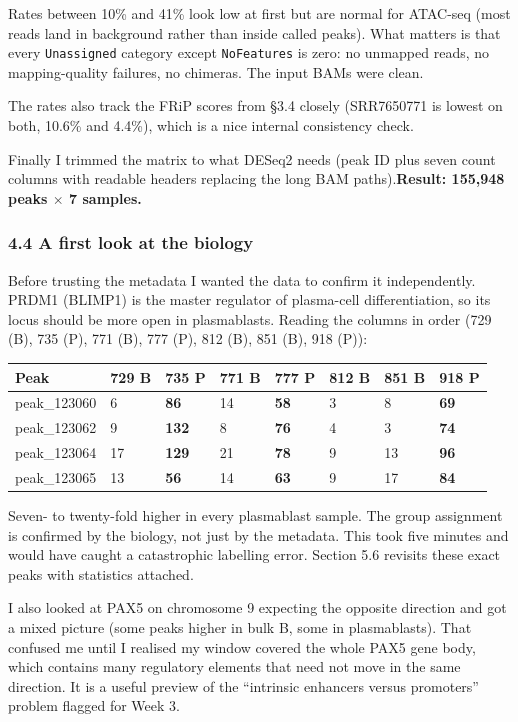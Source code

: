 \documentclass[
  11pt,
  a4paper,
]{article}
\begin{document}
Rates between 10\% and 41\% look low at first but are normal for
ATAC-seq (most reads land in background rather than inside called
peaks). What matters is that every \texttt{Unassigned} category except
\texttt{NoFeatures} is zero: no unmapped reads, no mapping-quality
failures, no chimeras. The input BAMs were clean.

The rates also track the FRiP scores from §3.4 closely (SRR7650771 is
lowest on both, 10.6\% and 4.4\%), which is a nice internal consistency
check.

Finally I trimmed the matrix to what DESeq2 needs (peak ID plus seven
count columns with readable headers replacing the long BAM
paths).\textbf{Result: 155,948 peaks \(\times\) 7 samples.}

\hypertarget{a-first-look-at-the-biology}{%
\subsubsection{4.4 A first look at the
biology}\label{a-first-look-at-the-biology}}

Before trusting the metadata I wanted the data to confirm it
independently. PRDM1 (BLIMP1) is the master regulator of plasma-cell
differentiation, so its locus should be more open in plasmablasts.
Reading the columns in order (729 (B), 735 (P), 771 (B), 777 (P), 812
(B), 851 (B), 918 (P)):

\begin{longtable}[]{@{}llllllll@{}}
\toprule\noalign{}
Peak & 729 B & 735 P & 771 B & 777 P & 812 B & 851 B & 918 P \\
\midrule\noalign{}
\endhead
\bottomrule\noalign{}
\endlastfoot
peak\_123060 & 6 & \textbf{86} & 14 & \textbf{58} & 3 & 8 &
\textbf{69} \\
peak\_123062 & 9 & \textbf{132} & 8 & \textbf{76} & 4 & 3 &
\textbf{74} \\
peak\_123064 & 17 & \textbf{129} & 21 & \textbf{78} & 9 & 13 &
\textbf{96} \\
peak\_123065 & 13 & \textbf{56} & 14 & \textbf{63} & 9 & 17 &
\textbf{84} \\
\end{longtable}

Seven- to twenty-fold higher in every plasmablast sample. The group
assignment is confirmed by the biology, not just by the metadata. This
took five minutes and would have caught a catastrophic labelling error.
Section 5.6 revisits these exact peaks with statistics attached.

I also looked at PAX5 on chromosome 9 expecting the opposite direction
and got a mixed picture (some peaks higher in bulk B, some in
plasmablasts). That confused me until I realised my window covered the
whole PAX5 gene body, which contains many regulatory elements that need
not move in the same direction. It is a useful preview of the
``intrinsic enhancers versus promoters'' problem flagged for Week 3.
\end{document}
